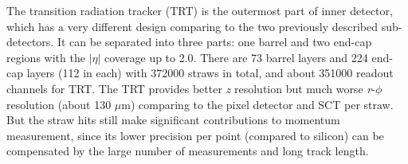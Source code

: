 The transition radiation tracker (TRT)\cite{TRT_2008} is the outermost part of inner detector, which has a very different design comparing to the two previously described sub-detectors.
It can be separated into three parts: one barrel and two end-cap regions with the $|\eta|$ coverage up to 2.0.
There are 73 barrel layers and 224 end-cap layers (112 in each) with 372000 straws in total, and about 351000 readout channels for TRT.
The TRT provides better \textit{z} resolution but much worse \textit{r}-$\phi$ resolution (about 130 $\mu$m) comparing to the pixel detector and SCT per straw.
But the straw hits still make significant contributions to momentum measurement, since its lower precision per point (compared to silicon) can be compensated by the large number of measurements and long track length.
